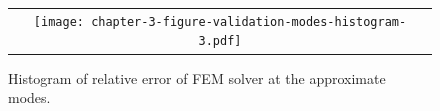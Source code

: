 \begin{figure}
  \begin{tabular}{c}
    \begin{minipage}{0.90\textwidth}
      \centering
      \texttt{[image: chapter-3-figure-validation-modes-histogram-3.pdf]}
      \caption{Histogram of relative error of FEM solver at the
        approximate modes.}
      \label{fig:modes-histogram-3}
    \end{minipage}
  \end{tabular}
\end{figure}